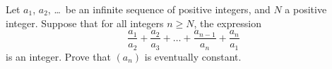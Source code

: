 Let $a_1$, $a_2$, \dots\ be an infinite sequence of positive integers,
and $N$ a positive integer.
Suppose that for all integers $n \ge N$, the expression
\[ \frac{a_1}{a_2} + \frac{a_2}{a_3} + \dots
  + \frac{a_{n-1}}{a_n} + \frac{a_n}{a_1} \]
is an integer.
Prove that $(a_n)$ is eventually constant.